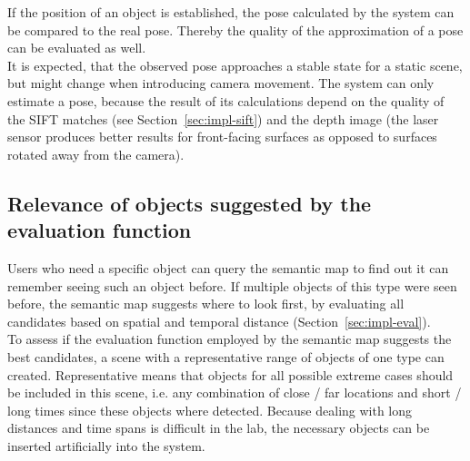 If the position of an object is established, the pose calculated by the system can be compared to the real pose. Thereby the quality of the approximation of a pose can be evaluated as well. \\

It is expected, that the observed pose approaches a stable state for a static scene, but might change when introducing camera movement. The system can only estimate a pose, because the result of its calculations depend on the quality of the SIFT matches (see Section~\ref{sec:impl-sift}) and the depth image (the laser sensor produces better results for front-facing surfaces as opposed to surfaces rotated away from the camera). \\




\subsection{Relevance of objects suggested by the evaluation function}
Users who need a specific object can query the semantic map to find out it can remember seeing such an object before. If multiple objects of this type were seen before, the semantic map suggests where to look first, by evaluating all candidates based on spatial and temporal distance (Section~\ref{sec:impl-eval}). \\

To assess if the evaluation function employed by the semantic map suggests the best candidates, a scene with a representative range of objects of one type can created. Representative means that objects for all possible extreme cases should be included in this scene, i.e. any combination of close / far locations and short / long times since these objects where detected. Because dealing with long distances and time spans is difficult in the lab, the necessary objects can be inserted artificially into the system. \\

